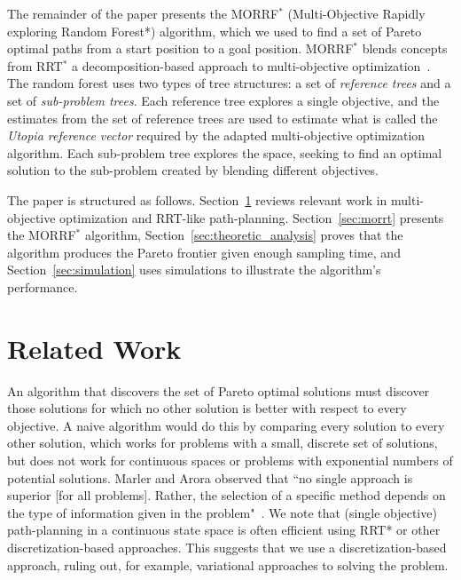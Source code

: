 \documentclass{article}
\begin{document}
The remainder of the paper presents the MORRF$^{*}$ (Multi-Objective Rapidly exploring Random Forest*) algorithm, which we used to find a set of Pareto optimal paths from a start position to a goal position.  
MORRF$^{*}$ blends concepts from RRT$^{*}$ a decomposition-based approach to multi-objective optimization~\cite{4358754}.  
The random forest uses two types of tree structures: a set of {\em reference trees} and a set of {\em sub-problem trees}.  
Each reference tree explores a single objective, and the estimates from the set of reference trees are used to estimate what is called the {\em Utopia reference vector} required by the adapted multi-objective optimization algorithm.  
Each sub-problem tree explores the space, seeking to find an optimal solution to the sub-problem created by blending different objectives. 

The paper is structured as follows.  
Section~\ref{sec:related_works} reviews relevant work in multi-objective optimization and RRT-like path-planning. 
Section~\ref{sec:morrt} presents the MORRF$^{*}$ algorithm,  
Section~\ref{sec:theoretic_analysis} proves that the algorithm produces the Pareto frontier given enough sampling time, 
and Section~\ref{sec:simulation} uses simulations to illustrate the algorithm's performance.

\section{Related Work}
\label{sec:related_works}

An algorithm that discovers the set of Pareto optimal solutions must discover those solutions for which no other solution is better with respect to every objective.  A naive algorithm would do this by comparing every solution to every other solution, which works for problems with a small, discrete set of solutions, but does not work for continuous spaces or problems with exponential numbers of potential solutions.  
Marler and Arora observed that ``no single approach is superior [for all problems].  
Rather, the selection of a specific method depends on the type of information given in the problem"~\cite{marler2004survey}.  
We note that (single objective) path-planning in a continuous state space is often efficient using RRT* or other discretization-based approaches. This suggests that we use a discretization-based approach, ruling out, for example, variational approaches to solving the problem.
\end{document}
